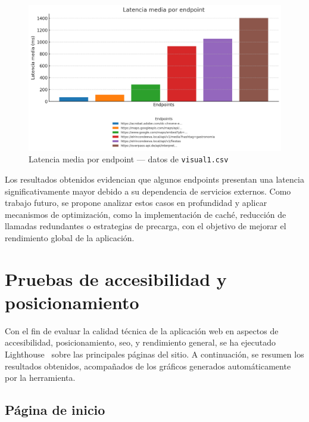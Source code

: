 \begin{figure}[h!tb]
  \centering
  \includegraphics[width=1\textwidth]{figs/entornoyactividades.png}
  \caption{Latencia media por endpoint — datos de \texttt{visual1.csv}}
  \label{fig:latencia-visual}
\end{figure}

Los resultados obtenidos evidencian que algunos endpoints presentan una latencia significativamente mayor debido a su dependencia de servicios externos. Como trabajo futuro, se propone analizar estos casos en profundidad y aplicar mecanismos de optimización, como la implementación de caché, reducción de llamadas redundantes o estrategias de precarga, con el objetivo de mejorar el rendimiento global de la aplicación.

\clearpage
\section{Pruebas de accesibilidad y posicionamiento}

Con el fin de evaluar la calidad técnica de la aplicación web en aspectos de accesibilidad, posicionamiento, \gls{seo}, y rendimiento general, se ha ejecutado Lighthouse~\cite{lighthouse:web} sobre las principales páginas del sitio. A continuación, se resumen los resultados obtenidos, acompañados de los gráficos generados automáticamente por la herramienta.

\subsection*{Página de inicio}

